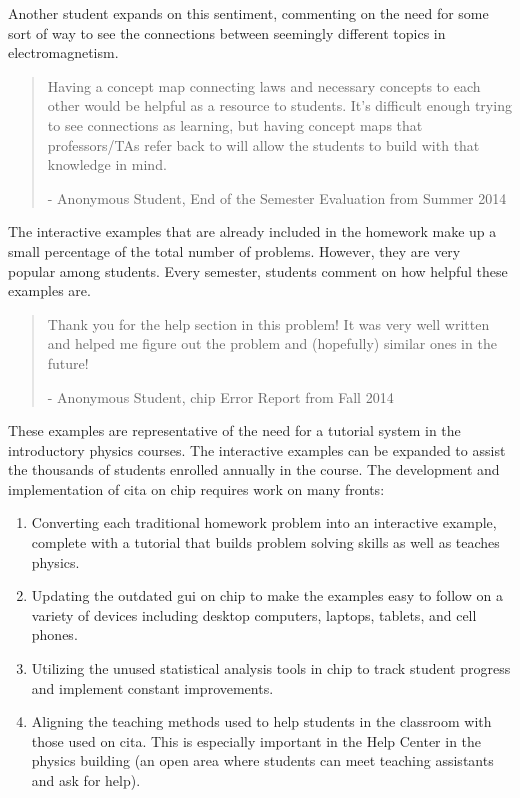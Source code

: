 \vspace{4mm}

Another student expands on this sentiment, commenting on the need for some sort of way to see the connections between seemingly different topics in electromagnetism.

\begin{quote}
Having a concept map connecting laws and necessary concepts to each other would be helpful as a resource to students. It's difficult enough trying to see connections as learning, but having concept maps that professors/TAs refer back to will allow the students to build with that knowledge in mind.

- Anonymous Student, End of the Semester Evaluation from Summer 2014
\end{quote}

\vspace{4mm}

The interactive examples that are already included in the homework make up a small percentage of the total number of problems. However, they are very popular among students. Every semester, students comment on how helpful these examples are.

\begin{quote}
Thank you for the help section in this problem! It was very well written and helped me figure out the problem and (hopefully) similar ones in the future!

- Anonymous Student, \gls{chip} Error Report from Fall 2014
\end{quote}

\vspace{4mm}

These examples are representative of the need for a tutorial system in the introductory physics courses. The interactive examples can be expanded to assist the thousands of students enrolled annually in the course. The development and implementation of \gls{cita} on \gls{chip} requires work on many fronts:

\begin{enumerate}
\item Converting each traditional homework problem into an interactive example, complete with a tutorial that builds problem solving skills as well as teaches physics.
\item Updating the outdated \gls{gui} on \gls{chip} to make the examples easy to follow on a variety of devices including desktop computers, laptops, tablets, and cell phones.
\item Utilizing the unused statistical analysis tools in \gls{chip} to track student progress and implement constant improvements.
\item Aligning the teaching methods used to help students in the classroom with those used on \gls{cita}. This is especially important in the Help Center in the physics building (an open area where students can meet teaching assistants and ask for help).
\end{enumerate}


